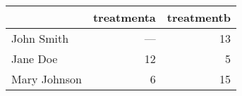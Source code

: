 \begin{tabular}{lrr}
  \toprule
  & treatmenta & treatmentb \\ 
  \midrule
  John Smith & --- &  13 \\ 
  Jane Doe &  12 &   5 \\ 
  Mary Johnson &   6 &  15 \\ 
   \bottomrule
\end{tabular}
